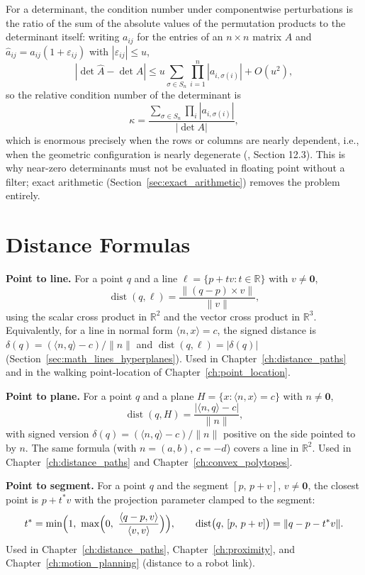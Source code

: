 For a determinant, the condition number under componentwise perturbations
is the ratio of the sum of the absolute values of the permutation products
to the determinant itself: writing $a_{ij}$ for the entries of an
$n\times n$ matrix $A$ and $\widehat a_{ij} = a_{ij}(1+\varepsilon_{ij})$
with $|\varepsilon_{ij}| \le u$,
\[
  |\det\widehat A - \det A|
  \le u \sum_{\sigma \in S_n}\prod_{i=1}^n |a_{i,\sigma(i)}| + O(u^2),
\]
so the relative condition number of the determinant is
\[
  \kappa = \frac{\sum_{\sigma \in S_n}\prod_i |a_{i,\sigma(i)}|}{|\det A|},
\]
which is enormous precisely when the rows or columns are nearly dependent,
i.e., when the geometric configuration is nearly degenerate
(\cite{higham2002}, Section 12.3). This is why near-zero determinants must
not be evaluated in floating point without a filter; exact arithmetic
(Section~\ref{sec:exact_arithmetic}) removes the problem entirely.


\section{Distance Formulas}
\label{sec:app_formulas_distances}

\medskip\noindent\textbf{Point to line.}
For a point $q$ and a line $\ell = \{ p + t v : t \in \mathbb{R} \}$ with
$v \neq \mathbf{0}$,
\[
  \operatorname{dist}(q, \ell) = \frac{\|(q - p)\times v\|}{\|v\|},
\]
using the scalar cross product in $\mathbb{R}^2$ and the vector cross
product in $\mathbb{R}^3$. Equivalently, for a line in normal form
$\langle n, x\rangle = c$, the signed distance is
$\delta(q) = (\langle n, q\rangle - c)/\|n\|$ and
$\operatorname{dist}(q, \ell) = |\delta(q)|$ (Section~\ref{sec:math_lines_hyperplanes}).
Used in Chapter~\ref{ch:distance_paths} and in the walking point-location
of Chapter~\ref{ch:point_location}.

\medskip\noindent\textbf{Point to plane.}
For a point $q$ and a plane $H = \{ x : \langle n, x\rangle = c \}$ with
$n \neq \mathbf{0}$,
\[
  \operatorname{dist}(q, H) = \frac{|\langle n, q\rangle - c|}{\|n\|},
\]
with signed version $\delta(q) = (\langle n, q\rangle - c)/\|n\|$
positive on the side pointed to by $n$. The same formula (with
$n = (a,b)$, $c = -d$) covers a line in $\mathbb{R}^2$. Used in
Chapter~\ref{ch:distance_paths} and Chapter~\ref{ch:convex_polytopes}.

\medskip\noindent\textbf{Point to segment.}
For a point $q$ and the segment $[p,\, p+v]$, $v \neq \mathbf{0}$, the
closest point is $p + t^* v$ with the projection parameter clamped to the
segment:
\[
  t^* = \min\Bigl(1,\ \max\Bigl(0,\ \frac{\langle q-p, v\rangle}{\langle v, v\rangle}\Bigr)\Bigr),
  \qquad
  \operatorname{dist}\bigl(q,\,[p,\, p+v]\bigr) = \|q - p - t^* v\|.
\]
Used in Chapter~\ref{ch:distance_paths}, Chapter~\ref{ch:proximity}, and
Chapter~\ref{ch:motion_planning} (distance to a robot link).

